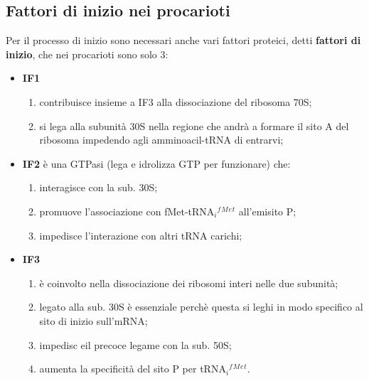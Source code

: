 \documentclass[11pt]{book}
\begin{document}
\subsection{Fattori di inizio nei
procarioti}\label{fattori-di-inizio-nei-procarioti}

Per il processo di inizio sono necessari anche vari fattori proteici,
detti \textbf{fattori di inizio}, che nei procarioti sono solo 3:

\begin{itemize}
\itemsep1pt\parskip0pt
\item
  \textbf{IF1}

  \begin{enumerate}
  \def\labelenumi{\arabic{enumi}.}
  \itemsep1pt\parskip0pt
  \item
    contribuisce insieme a IF3 alla dissociazione del ribosoma 70S;
  \item
    si lega alla subunità 30S nella regione che andrà a formare il sito
    A del ribosoma impedendo agli amminoacil-tRNA di entrarvi;
  \end{enumerate}
\item
  \textbf{IF2} è una GTPasi (lega e idrolizza GTP per funzionare) che:

  \begin{enumerate}
  \def\labelenumi{\arabic{enumi}.}
  \itemsep1pt\parskip0pt
  \item
    interagisce con la sub. 30S;
  \item
    promuove l'associazione con fMet-tRNA\(_i\)\(^f\)\(^M\)\(^e\)\(^t\)
    all'emisito P;
  \item
    impedisce l'interazione con altri tRNA carichi;
  \end{enumerate}
\item
  \textbf{IF3}

  \begin{enumerate}
  \def\labelenumi{\arabic{enumi}.}
  \itemsep1pt\parskip0pt
  \item
    è coinvolto nella dissociazione dei ribosomi interi nelle due
    subunità;
  \item
    legato alla sub. 30S è essenziale perchè questa si leghi in modo
    specifico al sito di inizio sull'mRNA;
  \item
    impedisc eil precoce legame con la sub. 50S;
  \item
    aumenta la specificità del sito P per
    tRNA\(_i\)\(^f\)\(^M\)\(^e\)\(^t\).
  \end{enumerate}
\end{itemize}
\end{document}
